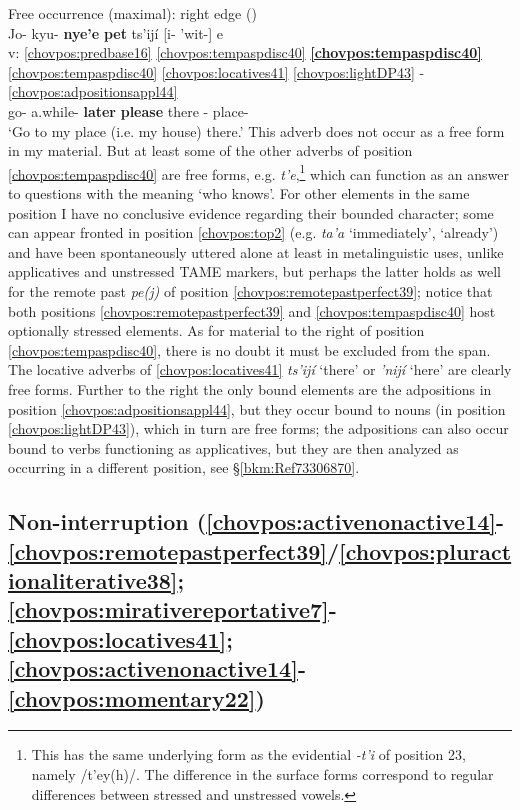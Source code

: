 \documentclass[output=paper]{langscibook}
\begin{document}
\ea\label{bkm:Ref90131499}Free occurrence (maximal): right edge (\citealt[70]{DraysonGomez2000}) \\
\glll {} Jo- kyu- \textbf{nye'e} \textbf{pet} ts'ijí [i- 'wit-] e\\
   v: \ref{chovpos:predbase16} \ref{chovpos:tempaspdisc40} \textbf{\ref{chovpos:tempaspdisc40}} \ref{chovpos:tempaspdisc40} \ref{chovpos:locatives41} \ref{chovpos:lightDP43} -   \ref{chovpos:adpositionsappl44}\\ 
{} go- a.while- \textbf{later} \textbf{please} there \First\Poss{}- place- \Ap \\
\glt `Go to my place (i.e. my house) there.'
\z 
 This adverb does not occur as a free form in my material. But at least some of the other adverbs of position \ref{chovpos:tempaspdisc40} are free forms, e.g. \textit{t'e},\footnote{This has the same underlying form as the evidential \textit{-t'i} of position 23, namely /t'ey(h)/. The difference in the surface forms correspond to regular differences between stressed and unstressed vowels.} which can function as an answer to questions with the meaning `who knows'. For other elements in the same position I have no conclusive evidence regarding their bounded character; some can appear fronted in position \ref{chovpos:top2} (e.g. \textit{ta'a} `immediately', `already') and have been spontaneously uttered alone at least in metalinguistic uses, unlike applicatives and unstressed TAME markers, but perhaps the latter holds as well for the remote past \textit{pe(j)} of position \ref{chovpos:remotepastperfect39}; notice that both positions \ref{chovpos:remotepastperfect39} and \ref{chovpos:tempaspdisc40} host optionally stressed elements. As for material to the right of position \ref{chovpos:tempaspdisc40}, there is no doubt it must be excluded from the span. The locative adverbs of \ref{chovpos:locatives41} \textit{ts'ijí} `there' or \textit{'nijí} `here' are clearly free forms. Further to the right the only bound elements are the adpositions in position \ref{chovpos:adpositionsappl44}, but they occur bound to nouns (in position \ref{chovpos:lightDP43}), which in turn are free forms; the adpositions can also occur bound to verbs functioning as applicatives, but they are then analyzed as occurring in a different position, see §\ref{bkm:Ref73306870}.

\subsection{Non-interruption (\ref{chovpos:activenonactive14}{}-\ref{chovpos:remotepastperfect39}/\ref{chovpos:pluractionaliterative38}; \ref{chovpos:mirativereportative7}{}-\ref{chovpos:locatives41}; \ref{chovpos:activenonactive14}{}-\ref{chovpos:momentary22})}
\end{document}
